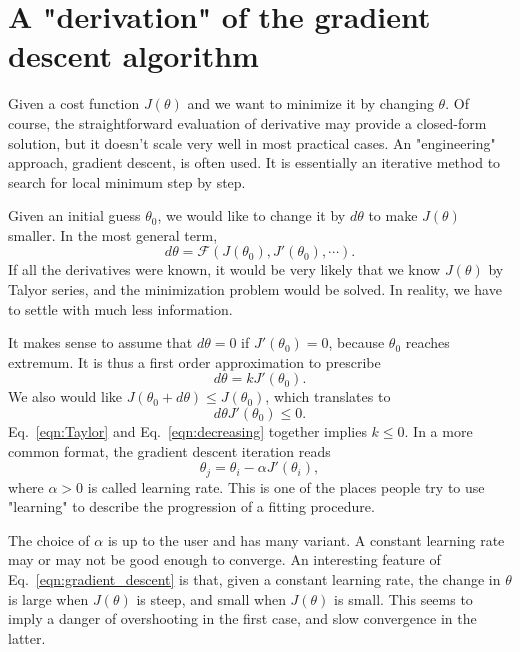 \section{A "derivation" of the gradient descent algorithm}
Given a cost function $J(\theta)$ and we want to minimize it by changing $\theta$. Of course, the straightforward evaluation of derivative may provide a closed-form solution, but it doesn't scale very well in most practical cases. An "engineering" approach, gradient descent, is often used. It is essentially an iterative method to search for local minimum step by step.

Given an initial guess $\theta_0$, we would like to change it by $d\theta$ to make $J(\theta)$ smaller. In the most general term,
\begin{equation}
d\theta = \mathcal{F}(J(\theta_0), J'(\theta_0), \cdots).
\end{equation} 
If all the derivatives were known, it would be very likely that we know $J(\theta)$ by Talyor series, and the minimization problem would be solved. In reality, we have to settle with much less information.  

It makes sense to assume that $d\theta=0$ if $J'(\theta_0) = 0$, because $\theta_0$ reaches extremum. It is thus a first order approximation to prescribe
\begin{equation}
d\theta = kJ'(\theta_0).\label{eqn:Taylor}
\end{equation}
We also would like $J(\theta_0+d\theta)\leq J(\theta_0)$, which translates to
\begin{equation}
d\theta J'(\theta_0)\leq 0.\label{eqn:decreasing}
\end{equation}
Eq.~\ref{eqn:Taylor} and Eq.~\ref{eqn:decreasing} together implies $k\leq 0$. In a more common format, the gradient descent iteration reads
\begin{equation}
\theta_j = \theta_i -\alpha J'(\theta_i),\label{eqn:gradient_descent}
\end{equation}
where $\alpha > 0$ is called learning rate. This is one of the places people try to use "learning" to describe the progression of a fitting procedure.

The choice of $\alpha$ is up to the user and has many variant. A constant learning rate may or may not be good enough to converge. An interesting feature of Eq.~\ref{eqn:gradient_descent} is that, given a constant learning rate, the change in $\theta$ is large when $J(\theta)$ is steep, and small when $J(\theta)$ is small. This seems to imply a danger of overshooting in the first case, and slow convergence in the latter.

